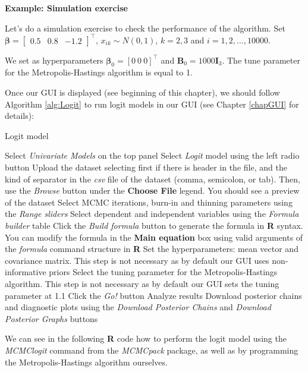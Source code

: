 \textbf{Example: Simulation exercise}

Let's do a simulation exercise to check the performance of the algorithm. Set $\bm{\beta}=\begin{bmatrix}0.5 & 0.8 & -1.2\end{bmatrix}^{\top}$, $x_{ik}\sim N(0,1)$, $k=2,3$ and $i=1,2,\dots,10000$.

We set as hyperparameters $\bm{\beta}_0=[0 \ 0 \ 0]^{\top}$ and ${\bm{B}}_0=1000{\bm{I}}_3$. The tune parameter for the Metropolis-Hastings algorithm is equal to 1.

Once our GUI is displayed (see beginning of this chapter), we should follow Algorithm \ref{alg:Logit} to run logit models in our GUI (see Chapter \ref{chapGUI} for details):
\begin{algorithm}[h!]
	\caption{Logit model}\label{alg:Logit}
	\begin{algorithmic}[1]  		 			
		\State Select \textit{Univariate Models} on the top panel
		\State Select \textit{Logit} model using the left radio button
		\State Upload the dataset selecting first if there is header in the file, and the kind of separator in the \textit{csv} file of the dataset (comma, semicolon, or tab). Then, use the \textit{Browse} button under the \textbf{Choose File} legend. You should see a preview of the dataset
		\State Select MCMC iterations, burn-in and thinning parameters using the \textit{Range sliders}
		\State Select dependent and independent variables using the \textit{Formula builder} table
		\State Click the \textit{Build formula} button to generate the formula in \textbf{R} syntax. You can modify the formula in the \textbf{Main equation} box using valid arguments of the \textit{formula} command structure in \textbf{R}
		\State Set the hyperparameters: mean vector and covariance matrix. This step is not necessary as by default our GUI uses non-informative priors
		\State Select the tuning parameter for the Metropolis-Hastings algorithm. This step is not necessary as by default our GUI sets the tuning parameter at 1.1
		\State Click the \textit{Go!} button
		\State Analyze results
		\State Download posterior chains and diagnostic plots using the \textit{Download Posterior Chains} and \textit{Download Posterior Graphs} buttons
	\end{algorithmic} 
\end{algorithm}

We can see in the following \textbf{R} code how to perform the logit model using the \textit{MCMClogit} command from the \textit{MCMCpack} package, as well as by programming the Metropolis-Hastings algorithm ourselves. 


